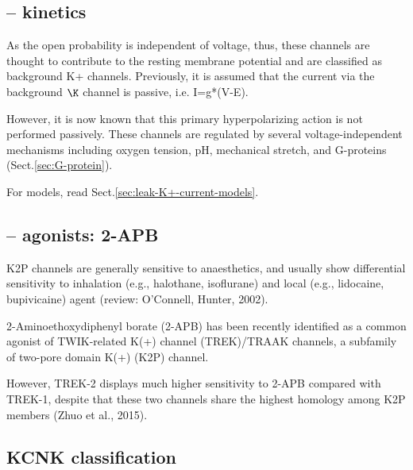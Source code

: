 \subsection{-- kinetics}

As the open probability is independent of voltage, thus, these channels are
thought to contribute to the resting membrane potential and are classified as
background K+ channels. Previously, it is assumed that the current via the
background $\K$ channel is passive, i.e. I=g*(V-E).

However, it is now known that this primary hyperpolarizing action is not
performed passively. These channels are regulated by several voltage-independent
mechanisms including oxygen tension, pH, mechanical stretch, and G-proteins
(Sect.\ref{sec:G-protein}). 

For models, read Sect.\ref{sec:leak-K+-current-models}.


\subsection{-- agonists: 2-APB}
\label{sec:2-APB}

K2P channels are generally sensitive to anaesthetics, and usually show
differential sensitivity to inhalation (e.g., halothane, isoflurane) and local
(e.g., lidocaine, bupivicaine) agent (review: O'Connell, Hunter, 2002).

2-Aminoethoxydiphenyl borate (2-APB) has been recently identified as a common
agonist of TWIK-related K(+) channel (TREK)/TRAAK channels, a subfamily of
two-pore domain K(+) (K2P) channel.

However, TREK-2 displays much higher sensitivity to 2-APB compared with TREK-1,
despite that these two channels share the highest homology among K2P members
(Zhuo et al., 2015).



\subsection{KCNK classification}
\label{sec:KCNK-classification}

